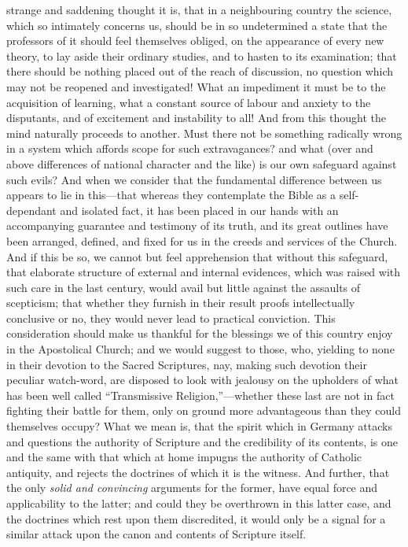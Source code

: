 strange and saddening thought it is, that in a neighbouring country the
science, which so intimately concerns us, should be in so undetermined a
state that the professors of it should feel themselves obliged, on the
appearance of every new theory, to lay aside their ordinary studies, and
to hasten to its examination; that there should be nothing placed out of
the reach of discussion, no question which may not be reopened and
investigated! What an impediment it must be to the acquisition of
learning, what a constant source of labour and anxiety to the
disputants, and of excitement and instability to all! And from this
thought the mind naturally proceeds to another. Must there not be
something radically wrong in a system which affords scope for such
extravagances? and what (over and above differences of national
character and the like) is our own safeguard against such evils? And
when we consider that the fundamental difference between us appears to
lie in this—that whereas they contemplate the Bible as a
self-dependant and isolated fact, it has been placed in our hands with
an accompanying guarantee and testimony of its truth, and its great
outlines have been arranged, defined, and fixed for us in the creeds and
services of the Church. And if this be so, we cannot but feel
apprehension that without this safeguard, that elaborate structure of
external and internal evidences, which was raised with such care in the
last century, would avail but little against the assaults of scepticism;
that whether they furnish in their result proofs intellectually
conclusive or no, they would never lead to practical conviction. This
consideration should make us thankful for the blessings we of this
country enjoy in the Apostolical Church; and we would suggest to those,
who, yielding to none in their devotion to the Sacred Scriptures, nay,
making such devotion their peculiar watch-word, are disposed to look
with jealousy on the upholders of what has been well called ``Transmissive
Religion,''—whether these last are not in fact fighting their battle
for them, only on ground more advantageous than they could themselves
occupy? What we mean is, that the spirit which in Germany attacks and
questions the authority of Scripture and the credibility of its
contents, is one and the same with that which at home impugns the
authority of Catholic antiquity, and rejects the doctrines of which it
is the witness. And further, that the only \emph{solid and convincing}
arguments for the former, have equal force and applicability to the
latter; and could they be overthrown in this latter case, and the
doctrines which rest upon them discredited, it would only be a signal
for a similar attack upon the canon and contents of Scripture itself.

